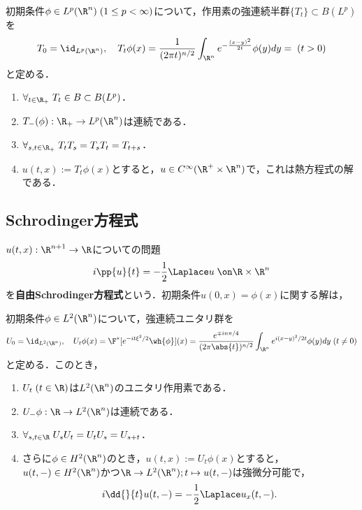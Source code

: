 \documentclass[uplatex, dvipdfmx]{jsreport}
\begin{document}
\begin{theorem}
    初期条件$\phi\in L^p(\R^n)\;(1\le p<\infty)$について，作用素の強連続半群$\{T_t\}\subset B(L^p)$を
    \[T_0=\id_{L^p(\R^n)},\quad T_t\phi(x)=\frac{1}{(2\pi t)^{n/2}}\int_{\R^n}e^{-\frac{(x-y)^2}{2t}}\phi(y)dy=\;(t>0)\]
    と定める．
    \begin{enumerate}
        \item $\forall_{t\in\R_+}\;T_t\in B\subset B(L^p)$．
        \item $T_-(\phi):\R_+\to L^p(\R^n)$は連続である．
        \item $\forall_{s,t\in\R_+}\;T_tT_s=T_sT_t=T_{t+s}$．
        \item $u(t,x):=T_t\phi(x)$とすると，$u\in C^\infty(\R^+\times\R^n)$で，これは熱方程式の解である．
    \end{enumerate}
\end{theorem}

\subsection{Schrodinger方程式}

\begin{problem}
    $u(t,x):\R^{n+1}\to\R$についての問題
    \[i\pp{u}{t}=-\frac{1}{2}\Laplace u\;\on\R\times\R^n\]
    を\textbf{自由Schrodinger方程式}という．初期条件$u(0,x)=\phi(x)$に関する解は，
\end{problem}

\begin{theorem}
    初期条件$\phi\in L^2(\R^n)$について，強連続ユニタリ群を
    \[U_0=\id_{L^2(\R^n)},\quad U_t\phi(x)=\F^*[e^{-it\xi^2/2}\wh{\phi}](x)=\frac{e^{\mp in\pi/4}}{(2\pi\abs{t})^{n/2}}\int_{\R^n}e^{i(x-y)^2/2t}\phi(y)dy\;(t\ne0)\]
    と定める．このとき，
    \begin{enumerate}
        \item $U_t\;(t\in\R)$は$L^2(\R^n)$のユニタリ作用素である．
        \item $U_-\phi:\R\to L^2(\R^n)$は連続である．
        \item $\forall_{s,t\in\R}\;U_sU_t=U_tU_s=U_{s+t}$．
        \item さらに$\phi\in H^2(\R^n)$のとき，$u(t,x):=U_t\phi(x)$とすると，$u(t,-)\in H^2(\R^n)$かつ$\R\to L^2(\R^n);t\mapsto u(t,-)$は強微分可能で，
        \[i\dd{}{t}u(t,-)=-\frac{1}{2}\Laplace u_x(t,-).\]
    \end{enumerate}
\end{theorem}
\end{document}
